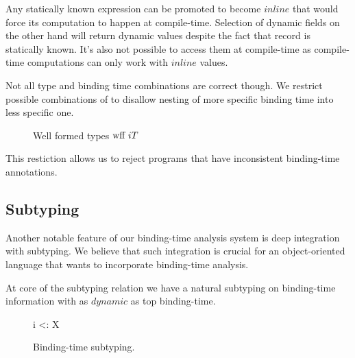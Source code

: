 Any statically known expression can be promoted to become $inline$ that would force its computation
to happen at compile-time. Selection of dynamic fields on the other hand will return dynamic values despite 
the fact that record is statically known. It's also not possible to access them at compile-time as 
compile-time computations can only work with $inline$ values.

Not all type and binding time combinations are correct though. We restrict possible combinations of 
to disallow nesting of more specific binding time into less specific one.

\begin{figure}
\begin{multicols}{2}

  {}

  {}

  {}
\end{multicols}
\caption {Well formed types $\wff{\i{T}}$}
\end{figure}

This restiction allows us to reject programs that have inconsistent binding-time annotations. 

\subsection{Subtyping}

Another notable feature of our binding-time analysis system is deep integration with subtyping. 
We believe that such integration is crucial for an object-oriented language that wants to 
incorporate binding-time analysis.

At core of the subtyping relation we have a natural subtyping on binding-time information
with as $dynamic$ as top binding-time.

\begin{figure}[H]
\begin{multicols}{2}




  {\Gamma \ts i <: X}
\end{multicols}
\caption{Binding-time subtyping.}
\end{figure}

